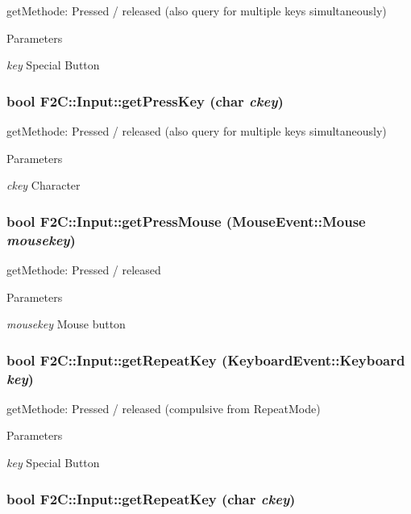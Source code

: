getMethode: Pressed / released (also query for multiple keys simultaneously) 
\begin{DoxyParams}{Parameters}
\item[{\em key}]Special Button \end{DoxyParams}
\hypertarget{class_f2_c_1_1_input_af3d14b1d81e6198c5e0fb5fccbdd0b5c}{
\subsubsection[{getPressKey}]{\setlength{\rightskip}{0pt plus 5cm}bool F2C::Input::getPressKey (char {\em ckey})}}
\label{class_f2_c_1_1_input_af3d14b1d81e6198c5e0fb5fccbdd0b5c}


getMethode: Pressed / released (also query for multiple keys simultaneously) 
\begin{DoxyParams}{Parameters}
\item[{\em ckey}]Character \end{DoxyParams}
\hypertarget{class_f2_c_1_1_input_a9f6ddd6c1cb000651956d4778bf5ed11}{
\subsubsection[{getPressMouse}]{\setlength{\rightskip}{0pt plus 5cm}bool F2C::Input::getPressMouse ({\bf MouseEvent::Mouse} {\em mousekey})}}
\label{class_f2_c_1_1_input_a9f6ddd6c1cb000651956d4778bf5ed11}


getMethode: Pressed / released 
\begin{DoxyParams}{Parameters}
\item[{\em mousekey}]Mouse button \end{DoxyParams}
\hypertarget{class_f2_c_1_1_input_aba74013667f7cc0ea8d3b53de03262cd}{
\subsubsection[{getRepeatKey}]{\setlength{\rightskip}{0pt plus 5cm}bool F2C::Input::getRepeatKey ({\bf KeyboardEvent::Keyboard} {\em key})}}
\label{class_f2_c_1_1_input_aba74013667f7cc0ea8d3b53de03262cd}


getMethode: Pressed / released (compulsive from RepeatMode) 
\begin{DoxyParams}{Parameters}
\item[{\em key}]Special Button \end{DoxyParams}
\hypertarget{class_f2_c_1_1_input_a5fab8a63b42332d5da2c648654a93f82}{
\subsubsection[{getRepeatKey}]{\setlength{\rightskip}{0pt plus 5cm}bool F2C::Input::getRepeatKey (char {\em ckey})}}
\label{class_f2_c_1_1_input_a5fab8a63b42332d5da2c648654a93f82}


